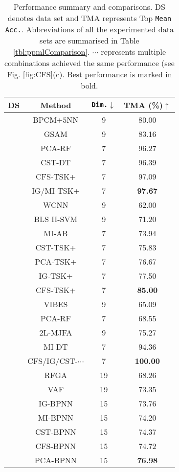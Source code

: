 \documentclass{article}
\newcommand*{\1}{\textcolor{magenta}}
\begin{document}
\begin{table}
	\centering
	\caption{Performance summary and comparisons. DS denotes data set and TMA represents Top \texttt{Mean Acc.}. Abbreviations of all the experimented data sets are summarised in Table \ref{tbl:ppmlComparison}. $\cdots$ represents multiple combinations achieved the same performance (see Fig. \ref{fig:CFS}(c). Best performance is marked in bold.}
	\begin{tabular}{c|c|c|c}
		\hline
		DS
		& Method & \texttt{Dim.}$\downarrow$ & TMA (\%)$\uparrow$\\
		\hline
		\hline
		\multirow{6}{*}{\rotatebox{90}{CCRFDS}} & BPCM+$5$NN \cite{li2019bayesian} & 9 & 80.00\\ 
		& GSAM \cite{lu2020machine} & 9 & 83.16\\
		& PCA-RF & 7 & 96.27\\ 
		& CST-DT & 7 & 96.39\\
		& CFS-TSK+ & 7 & 97.09\\
		& IG/MI-TSK+ & 7 & \textbf{97.67}\\
		
		\hline
		\multirow{7}{*}{\rotatebox{90}{BCCDS}} & WCNN \cite{livieris2019improving} & 9 & 62.00\\ 
		& BLS II-SVM \cite{tang2019construction} & 9 & 71.20\\
		& MI-AB & 7 & 73.94\\
		& CST-TSK+ & 7 & 75.83\\
		& PCA-TSK+ & 7 & 76.67\\
		& IG-TSK+ & 7 & 77.50\\
		& CFS-TSK+ & 7 & \textbf{85.00}\\
		
		\hline
		\multirow{5}{*}{\rotatebox{90}{BTDS}} & VIBES \cite{aydin2019construction} & 9 & 65.09\\
		& PCA-RF & 7 & 68.55\\
		& 2L-MJFA \cite{yang2018new} & 9 & 75.27\\
		& MI-DT & 7 & 94.36\\
		& CFS/IG/CST-$\cdots$ & 7 & \textbf{100.00}\\
		
		\hline
		\multirow{7}{*}{\rotatebox{90}{DRDDS}} & RFGA \cite{elyan2017genetic} & 19 & 68.26\\
		& VAF \cite{apicella2019simple} & 19 & 73.35\\
		& IG-BPNN & 15 & 73.76\\
		& MI-BPNN & 15 & 74.20\\
		& CST-BPNN & 15 & 74.37\\
		& CFS-BPNN & 15 & 74.72\\ 
		& PCA-BPNN & 15 & \textbf{76.98}\\ 
		\hline
	\end{tabular}
	\label{tbl:csktsk+}
\end{table}
\end{document}

